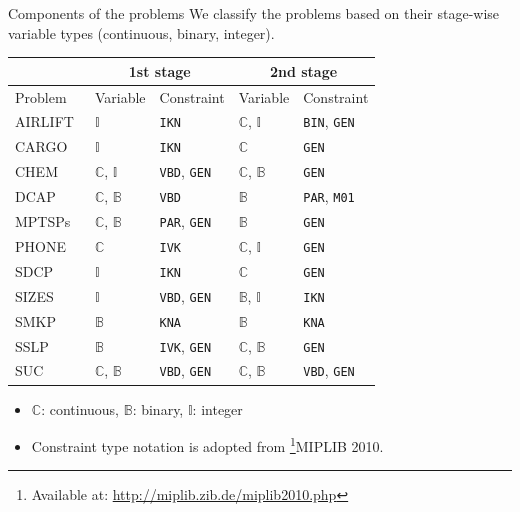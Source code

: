 \documentclass{beamer}
\def\seven{\fontsize{7pt}{7pt}\selectfont}
\newcommand{\miplib}{\textsf{MIPLIB 2010}}
\newcommand{\airlift}{\textsf{AIRLIFT}}
\newcommand{\chem}{\textsf{CHEM}}
\newcommand{\dcap}{\textsf{DCAP}}
\newcommand{\sdcp}{\textsf{SDCP}}
\newcommand{\mptsps}{\textsf{MPTSPs}}
\newcommand{\sizes}{\textsf{SIZES}}
\newcommand{\smkp}{\textsf{SMKP}}
\newcommand{\sslp}{\textsf{SSLP}}
\newcommand{\suc}{\textsf{SUC}}
\newcommand{\cargo}{\textsf{CARGO}}
\newcommand{\phone}{\textsf{PHONE}}
\begin{document}
\begin{frame}{Components of the problems}
We classify the problems based on their stage-wise variable types (continuous, binary, integer).		
\begin{table}[H]
\seven
\centering
\label{table:prob_class}
\begin{threeparttable}
\begin{tabular}{@{}lllll@{}}
\toprule
& \multicolumn{2}{c}{1st stage}                              				  	& \multicolumn{2}{c}{2nd stage}                             			        \\ \midrule
Problem 	     & Variable                    & Constraint                   	& Variable                    & Constraint                  				    \\ \midrule
\airlift\  & $\mathbb{I}$ & \texttt{IKN}& $\mathbb{C}$, $\mathbb{I}$ & \texttt{BIN}, \texttt{GEN}\\
\cargo\  & $\mathbb{I}$ & \texttt{IKN} & $\mathbb{C}$ & \texttt{GEN}\\		
\chem\  & $\mathbb{C}$, $\mathbb{I}$ & \texttt{VBD}, \texttt{GEN} & $\mathbb{C}$, $\mathbb{B}$ & \texttt{GEN}\\				
\dcap\     & $\mathbb{C}$, $\mathbb{B}$  & \texttt{VBD}                	& $\mathbb{B}$                & \texttt{PAR}, \texttt{M01} 			    		\\
\mptsps\   & $\mathbb{C}$, $\mathbb{B}$  & \texttt{PAR}, \texttt{GEN}		& $\mathbb{B}$                & \texttt{GEN}               						\\
\phone\  & $\mathbb{C}$ & \texttt{IVK} & $\mathbb{C}$, $\mathbb{I}$ & \texttt{GEN} \\			
\sdcp\ & $\mathbb{I}$ & \texttt{IKN}& $\mathbb{C}$ & \texttt{GEN}\\
\sizes\  & $\mathbb{I}$ 			   & \texttt{VBD}, \texttt{GEN} 	& $\mathbb{B}$, $\mathbb{I}$  & \texttt{IKN}             						\\
\smkp\   & $\mathbb{B}$                & \texttt{KNA}                	& $\mathbb{B}$                & \texttt{KNA}              						\\
\sslp\   & $\mathbb{B}$                & \texttt{IVK}, \texttt{GEN} 	& $\mathbb{C}$, $\mathbb{B}$  & \texttt{GEN}             						\\
\suc\   & $\mathbb{C}$, $\mathbb{B}$                 & \texttt{VBD}, \texttt{GEN}       	& $\mathbb{C}$, $\mathbb{B}$  &  \texttt{VBD}, \texttt{GEN}                                  					\\ \bottomrule
\end{tabular}
\end{threeparttable}
\end{table}
\vspace{-0.5cm}
\begin{itemize}
\item $\mathbb{C}$: continuous, $\mathbb{B}$: binary, $\mathbb{I}$: integer
\item Constraint type notation is adopted from \footnote{\tiny Available at: \href{http://miplib.zib.de/miplib2010.php}{http://miplib.zib.de/miplib2010.php}}{\miplib}.
\end{itemize}
\end{frame}
\end{document}
